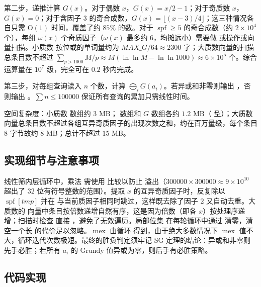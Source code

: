 第二步，递推计算 $G(x)$。对于偶数 $x$，$G(x) = x/2 - 1$；对于奇质数 $x$，$G(x) = 0$；对于含因子 $3$ 的奇合成数，$G(x) = \lfloor (x-3)/4 \rfloor$；这三种情况各自只需 $\mathrm{O}(1)$ 时间，覆盖了约 $85\%$ 的数。对于 $\operatorname{spf} \ge 5$ 的奇合成数（约 $2 \times 10^4$ 个），每组 $\omega(x)$ 个奇质因子（$\omega(x)$ 最多约 $6$，均摊远小）需要做  或操作或向量扫描。小质数  按位或的单词量约为 $\mathit{MAX\_G} / 64 \approx 2300$ 字；大质数向量的扫描总条目数不超过 $\sum_{p > 1000} M/p \approx M(\ln \ln M - \ln \ln 1000) \approx 6 \times 10^5$ 个。综合运算量在 $10^7$ 级，完全可在 $0.2$ 秒内完成。

第三步，对每组查询读入 $n$ 个数，计算 $\bigoplus_i G(a_i)$。若异或和非零则输出 ，否则输出 。$\sum n \le 100000$ 保证所有查询的累加只需线性时间。

空间复杂度：小质数  数组约 $3$ MB； 数组和 $G$ 数组各约 $1.2$ MB（ 型）；大质数向量总条目数不超过各组互异奇质因子的出现次数之和，约在百万量级，每个条目 $8$ 字节故约 $8$ MB；总计不超过 $15$ MB。

\subsection{实现细节与注意事项}

线性筛内层循环中，乘法  需使用  比较以防止  溢出（$300000 \times 300000 \approx 9 \times 10^{10}$ 超出了 $32$ 位有符号整数的范围）。提取 $x$ 的互异奇质因子时，反复除以 $\operatorname{spf}[tmp]$ 并在  与当前质因子相同时跳过，这样既去除了因子 $2$ 又自动去重。大质数的  向量中条目按倍数递增自然有序，这是因为倍数（即各 $x$）按处理序递增；扫描时检查  直接 ，避免了无效遍历。局部位集  在每轮循环中通过  清零，清空一个长  的代价足以忽略。$\operatorname{mex}$ 由循环  得到，由于绝大多数情况下 $\operatorname{mex}$ 值不大，循环迭代次数极短。最终的胜负判定须牢记 SG 定理的结论：异或和非零则先手必胜；若所有 $a_i$ 的 Grundy 值异或为零，则后手有必胜策略。

\subsection{代码实现}

\inputminted{c++}{../src/p10_not_coprime_game.cpp}
